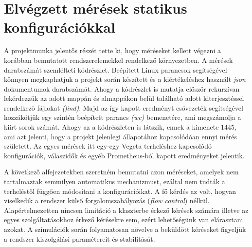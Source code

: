 \section{Elvégzett mérések statikus konfigurációkkal}
A projektmunka jelentős részét tette ki, hogy méréseket kellett végezni a korábban bemutatott rendszerelemekkel rendelkező környezetben.
A mérések darabszámát szemlélteti  kódrészlet. Beépített Linux parancsok segítségével könnyen megkaphatjuk a projekt során készített és a kiértékeléshez használt \textit{json} dokumentumok darabszámát. Ahogy a kódrészlet is mutatja először rekurzívan lekérdezzük az adott mappán és almappákon belül található adott kiterjesztéssel rendelkező fájlokat \textit{(find)}. 
Majd az így kapott eredményt csővezeték segítségével hozzákötjük egy szintén beépített parancs \textit{(wc)} bemenetére, ami megszámolja a kiírt sorok számát. 
Ahogy az a kódrészleten is látszik, ennek a kimenete $1445$, ami azt jelenti, hogy a projekt jelenlegi állapotához kapcsolódóan ennyi mérés született. %
Az egyes mérések itt egy-egy Vegeta terheléshez kapcsolódó konfigurációk, válaszidők és egyéb Prometheus-ból kapott eredményeket jelentik.

\lstset{caption=Elvégzett mérések száma, label=number_of_measurements}


A következő alfejezetekben szeretném bemutatni azon méréseket, amelyek nem tartalmaztak semmilyen automatikus mechanizmust, ezáltal nem tudták a terheléstől függően módosítani a konfigurációikat.
A fő kérdés az volt, hogyan viselkedik a rendszer külső forgalomszabályozás (\textit{flow control}) nélkül.
Alapértelmezetten nincsen limitáció a klaszterbe érkező kérések számára illetve az egyes szolgáltatásokhoz érkező kérésekre sem, ezért lehetőségünk van elárasztani azokat.
A szimulációk során folyamatosan növelve a beküldött kéréseket figyeljük a rendszer kiszolgálási paramétereit és stabilitását.

